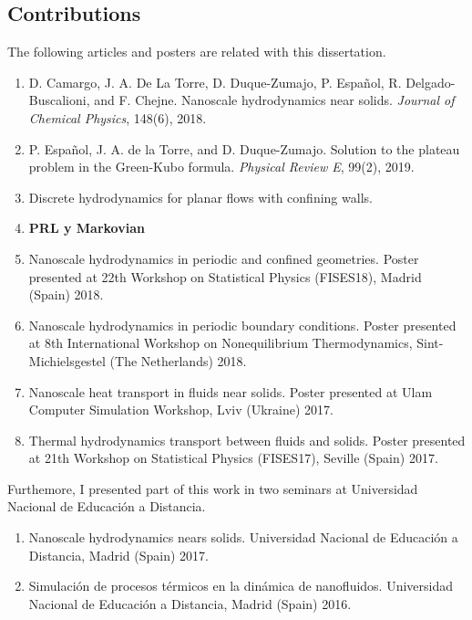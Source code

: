 \documentclass[b5paper,openright,10pt]{book}
\newcommand{\Note}[1]{{\bf \color{red}#1}}    %
\begin{document}
\pagestyle{Contents}




\begin{appendices}
\chapter{Contributions}\label{Ap:Contributions}
\pagestyle{noHeader}
The following articles and posters are related with this dissertation.
\begin{enumerate}
  \item \cite{Camargo2018} D. Camargo, J. A. De La Torre, D. Duque-Zumajo, P. Español, R. Delgado-Buscalioni, and F. Chejne. Nanoscale hydrodynamics near solids. \textit{Journal of Chemical Physics}, 148(6), 2018.
  \item \cite{Espanol2019e} P. Español, J. A. de la Torre, and D. Duque-Zumajo. Solution to the plateau problem in the Green-Kubo formula. \textit{Physical Review E}, 99(2), 2019.
  \item \cite{Discrete1} Discrete hydrodynamics for planar flows with confining walls.
  \item \Note{PRL y Markovian}
  \item \cite{FISESMadrid} Nanoscale hydrodynamics in periodic and confined geometries. Poster presented at 22th Workshop on Statistical Physics (FISES18), Madrid (Spain) 2018.
  \item \cite{IWNET} Nanoscale hydrodynamics in periodic boundary conditions. Poster presented at 8th International Workshop on Nonequilibrium Thermodynamics, Sint-Michielsgestel (The Netherlands) 2018.
  \item \cite{Ulam} Nanoscale heat transport in fluids near solids. Poster presented at Ulam Computer Simulation Workshop, Lviv (Ukraine) 2017.
  \item \cite{FISESSevilla} Thermal hydrodynamics transport between fluids and solids. Poster presented at 21th Workshop on Statistical Physics (FISES17), Seville (Spain) 2017.
  \end{enumerate}

  Furthemore, I presented part of this work in two seminars at Universidad Nacional de Educación a Distancia. 
  \begin{enumerate}
  \item Nanoscale hydrodynamics nears solids. Universidad Nacional de Educación a Distancia, Madrid (Spain) 2017.
              \item Simulación de procesos térmicos en la dinámica de nanofluidos. Universidad Nacional de Educación a Distancia, Madrid (Spain) 2016.
  \end{enumerate}





\end{appendices}
\end{document}
